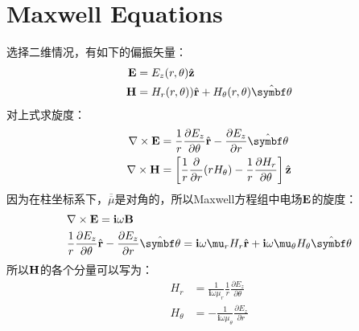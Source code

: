 
\chapter{Maxwell Equations}

选择二维情况，有如下的偏振矢量：
\begin{subequations}
  \begin{align}
    {\bf E}&=E_z(r,\theta)\hat{\bf z} \\
    {\bf H}&=H_r(r,\theta))\hat{ \bf r}+H_\theta(r,\theta)\hat{\bm
      \theta}
  \end{align}
\end{subequations}
对上式求旋度：
\begin{subequations}
  \begin{align}
    \nabla\times{\bf E}&=\frac{1}{r}\frac{\partial E_z}{\partial\theta}{\hat{\bf r}}-\frac{\partial E_z}{\partial r}{\hat{\bm\theta}}\\
    \nabla\times{\bf H}&=\left[\frac{1}{r}\frac{\partial}{\partial
        r}(rH_\theta)-\frac{1}{r}\frac{\partial
        H_r}{\partial\theta}\right]{\hat{\bf z}}
  \end{align}
\end{subequations}
因为在柱坐标系下，$\overline{\overline\mu}$是对角的，所以Maxwell方程组中电场$\bf E$的旋度：
\begin{subequations}
  \begin{align}
    &\nabla\times{\bf E}=\mathbf{i}\omega{\bf B} \\
    &\frac{1}{r}\frac{\partial E_z}{\partial\theta}{\hat{\bf
        r}}-\frac{\partial E_z}{\partial
      r}{\hat{\bm\theta}}=\mathbf{i}\omega\mu_rH_r{\hat{\bf r}}+\mathbf{i}\omega\mu_\theta
    H_\theta{\hat{\bm\theta}}
  \end{align}
\end{subequations}
所以$\bf H$的各个分量可以写为：
\begin{subequations}
  \begin{align}
    H_r&=\frac{1}{\mathbf{i}\omega\mu_r}\frac{1}{r}\frac{\partial
      E_z}{\partial\theta } \\
    H_\theta&=-\frac{1}{\mathbf{i}\omega\mu_\theta}\frac{\partial E_z}{\partial r}
  \end{align}
\end{subequations}
